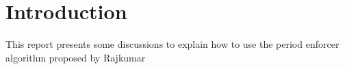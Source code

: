 \section{Introduction} 
This report presents some discussions to explain how to use the period enforcer algorithm proposed by Rajkumar \cite{Rajkumar_1991}
